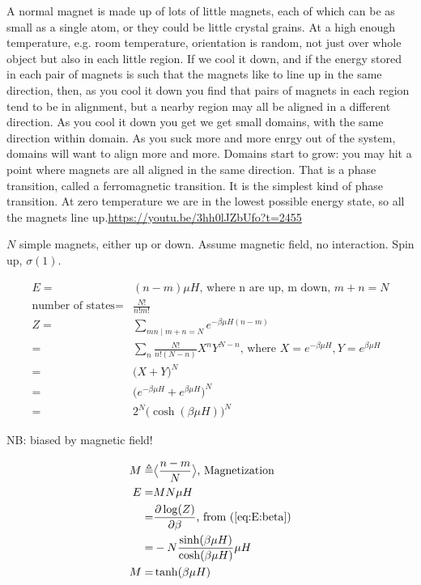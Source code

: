 \documentclass[]{article}
\begin{document}
A normal magnet is made up of lots of little magnets, each of which can be as small as a single atom, or they could be little crystal grains. At a high enough temperature, e.g. room temperature, orientation is random, not just over whole object but also in each little region. If we cool it down, and if the energy stored in each pair of magnets is such that the magnets like to line up in the same direction, then, as you cool it down you find that pairs of magnets in each region tend to be in alignment, but a nearby region may all be aligned in a different direction. As you cool it down you get we get small domains, with the same direction within domain. As you suck more and more enrgy out of the system, domains will want to align more and more. Domains start to grow: you may hit a point where magnets are all aligned in the same direction. That is a phase transition, called a ferromagnetic transition. It is the simplest kind of phase transition. At zero temperature we are in the lowest possible energy state, so all the magnets line up.\url{https://youtu.be/3hh0lJZbUfo?t=2455}

$N$ simple magnets, either up or down. Assume magnetic field, no interaction. Spin up, $\sigma(1).$

\begin{align*}
	E=&(n-m)\mu H\text{, where n are up, m down, $m+n=N$}\\
	\text{number of states} =&\frac{N!}{n!m!}\\
	Z =&\sum_{mn\mid m+n=N} e^{- \beta \mu H(n-m)}\\
	=&\sum_{n}\frac{N!}{n!(N-n)}X^nY^{N-n}\text{, where $X=e^{-\beta\mu H},Y=e^{\beta\mu H}$}\\
	=&\big(X+Y\big)^N\tag*{from the Binomial Theorem}\\
	=&\big(e^{-\beta\mu H}+e^{\beta\mu H}\big)^N\\
	=&2^N \big(\cosh(\beta\mu H)\big)^N\tag*{Definition of cosh}
\end{align*}

NB: biased by magnetic field!

\begin{align*}
	M \triangleq& \big< \frac{n-m}{N}\big>\text{, Magnetization} \\
	E =& M N \mu H\\
	=& \frac{\partial \log(Z)}{\partial \beta} \text{, from (\ref{eq:E:beta})}\\
	=& - N \frac{\sinh(\beta\mu H)}{\cosh(\beta\mu H)} \mu H\\
	M=& \tanh(\beta\mu H)
\end{align*}
\end{document}
